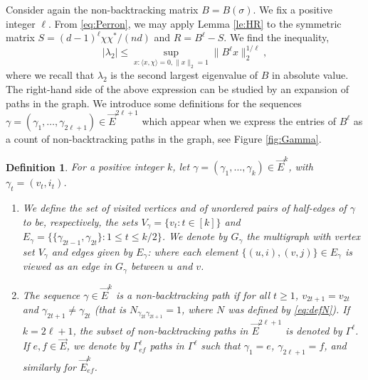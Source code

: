 \documentclass[11pt]{article}
\newtheorem{definition}[lemma]{Definition}
\newcommand{\cE}{E}
\newcommand{\1}{1\!\!{\sf I}}\newcommand{\IND}{\1}
\begin{document}
Consider again the non-backtracking matrix $B = B(\sigma)$. We fix a positive integer $\ell$. From \eqref{eq:Perron}, we may apply Lemma \ref{le:HR} to the symmetric matrix $S  = ( d-1) ^\ell \chi \chi^* / ( n d)$ and $R = B^\ell - S$. We find the inequality, 
\begin{equation}\label{eq:basicl2}
| \lambda_2 | \leq \sup_{x : \langle x , \chi \rangle  = 0 , \| x \|_2 = 1}   \| B^{\ell} x \|_2^{1/ \ell},
\end{equation}
where we recall that $\lambda_2$ is the second largest eigenvalue of $B$ in absolute value. The right-hand side of the above expression can be studied by an expansion of paths in the graph.  We introduce some definitions for the  sequences $ \gamma = (\gamma_1, \ldots, \gamma_{2\ell+1} ) \in \vec E^{2\ell+1}$ which appear when we express the entries of $B^{\ell}$ as a count of non-backtracking paths in the graph, see Figure \ref{fig:Gamma}.


\begin{definition}\label{def1}
For a positive integer $k$, let $ \gamma = (\gamma_1, \ldots, \gamma_{k} ) \in \vec E^{k}$, with $\gamma_t = ( v_t, i_t)$. 
\begin{enumerate}[-]
\item 
We define the set of {\em visited vertices} and of {\em unordered pairs of half-edges} of $\gamma$ to be, respectively, the sets  $V_\gamma = \{ v_{t}  :    t\in [k] \}$ and $\cE_\gamma = \{ \{ \gamma_{2t-1}, \gamma_{2t} \}  : 1 \leq t \leq k/2\}$. We denote by $G_\gamma$ the multigraph with vertex set $V_\gamma$ and edges given  by $\cE_\gamma$: where each element $ \{ (u,i) , (v,j) \} \in \cE_\gamma$ is viewed as an edge in $G_\gamma$ between $u$ and $v$.  
\item
The sequence $\gamma \in \vec E^{k}$ is a {\em non-backtracking path} if for all $t \geq 1$, $v_{2t+1} = v_{2t}$ and $\gamma_{2t+1} \ne \gamma_{2t}$ (that is $N_{\gamma_{2t} \gamma_{2t+1}} = 1$, where $N$ was defined by \eqref{eq:defN}). If $k = 2\ell +1$, the subset of non-backtracking  paths in $\vec E^{2\ell+1}$ is denoted by $\Gamma^{\ell}$.  If $e, f \in \vec E$, we denote by $\Gamma^{\ell}_{ef}$   paths in $\Gamma^{\ell}$ such that $\gamma_1 = e$, $\gamma_{2\ell +1} = f$, and similarly for $\vec E^{k} _{ef}$. 

\end{enumerate}
\end{definition}
\end{document}
